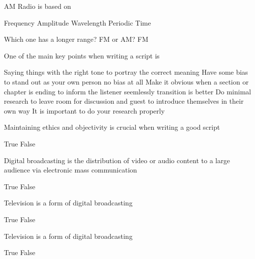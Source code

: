 \documentclass[theme=sleek, randomorder, hidesidemenu]{webquiz}
\begin{document}
\begin{question}
  AM Radio is based on
  \begin{choice}
    \incorrect Frequency
    \correct Amplitude
    \incorrect Wavelength
    \incorrect Periodic Time
  \end{choice}
\end{question}

\begin{question}
  Which one has a longer range? FM or AM?
  \answer[lower] FM
\end{question}

\begin{question}
  One of the main key points when writing a script is
  \begin{choice}
    \correct Saying things with the right tone to portray the correct meaning
    \incorrect Have some bias to stand out as your own person
    \feedback no bias at all
    \incorrect Make it obvious when a section or chapter is ending to inform the listener
    \feedback seemlessly transition is better
    \incorrect Do minimal research to leave room for discussion and guest to introduce themselves in their own way
    \feedback It is important to do your research properly
  \end{choice}
\end{question}

\begin{question}
    Maintaining ethics and objectivity is crucial when writing a good script
  \begin{choice}
    \correct True
    \incorrect False
  \end{choice}
\end{question}

\begin{question}
    Digital broadcasting is the distribution of video or audio content to a large audience via electronic mass communication
  \begin{choice}
    \correct True
    \incorrect False
  \end{choice}
\end{question}

\begin{question}
  Television is a form of digital broadcasting
  \begin{choice}
    \correct True
    \incorrect False
  \end{choice}
\end{question}

\begin{question}
  Television is a form of digital broadcasting
  \begin{choice}
    \correct True
    \incorrect False
  \end{choice}
\end{question}
\end{document}
